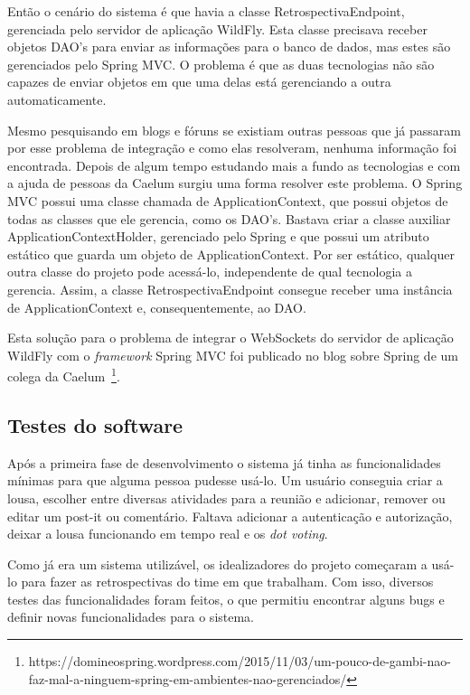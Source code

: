 Então o cenário do sistema é que havia a classe RetrospectivaEndpoint, gerenciada pelo servidor de aplicação WildFly. Esta classe precisava receber objetos DAO's para enviar as informações para o banco de dados, mas estes são gerenciados pelo Spring MVC. O problema é que as duas tecnologias não são capazes de enviar objetos em que uma delas está gerenciando a outra automaticamente.

Mesmo pesquisando em blogs e fóruns se existiam outras pessoas que já passaram por esse problema de integração e como elas resolveram, nenhuma informação foi encontrada. Depois de algum tempo estudando mais a fundo as tecnologias e com a ajuda de pessoas da Caelum surgiu uma forma resolver este problema. O Spring MVC possui uma classe chamada de ApplicationContext, que possui objetos de todas as classes que ele gerencia, como os DAO's. Bastava criar a classe auxiliar ApplicationContextHolder, gerenciado pelo Spring e que possui um atributo estático que guarda um objeto de ApplicationContext. Por ser estático, qualquer outra classe do projeto pode acessá-lo, independente de qual tecnologia a gerencia. Assim, a classe RetrospectivaEndpoint consegue receber uma instância de ApplicationContext e, consequentemente, ao DAO.

Esta solução para o problema de integrar o WebSockets do servidor de aplicação WildFly com o \textit{framework} Spring MVC foi publicado no blog sobre Spring de um colega da Caelum~\footnote{https://domineospring.wordpress.com/2015/11/03/um-pouco-de-gambi-nao-faz-mal-a-ninguem-spring-em-ambientes-nao-gerenciados/}. 

\subsection{Testes do software}

Após a primeira fase de desenvolvimento o sistema já tinha as funcionalidades mínimas para que alguma pessoa pudesse usá-lo. Um usuário conseguia criar a lousa, escolher entre diversas atividades para a reunião e adicionar, remover ou editar um post-it ou comentário. Faltava adicionar a autenticação e autorização, deixar a lousa funcionando em tempo real e os \textit{dot voting}.

Como já era um sistema utilizável, os idealizadores do projeto começaram a usá-lo para fazer as retrospectivas do time em que trabalham. Com isso, diversos testes das funcionalidades foram feitos, o que permitiu encontrar alguns bugs e definir novas funcionalidades para o sistema.

